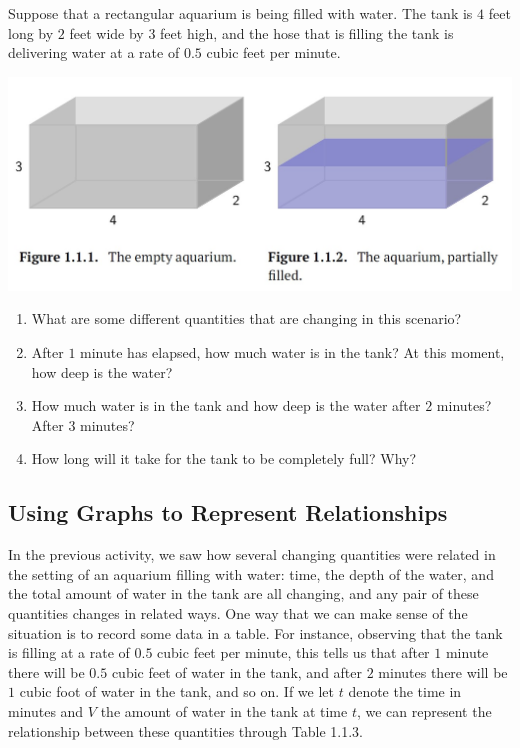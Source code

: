 \documentclass{ximera}
\begin{document}
\begin{tcolorbox}[colback=yellow!15, breakable,pad at break*=1mm]
\begin{example}
Suppose that a rectangular aquarium is being filled with water.  The tank is \(4\) feet long by \(2\) feet wide by \(3\) feet high, and the hose that is filling the tank is delivering water at a rate of \(0.5\) cubic feet per minute.

\includegraphics[width=\textwidth]{APCfigure1-1-1.jpg}

\begin{enumerate}[label=\alph*.]
\item What are some different quantities that are changing in this scenario?%
\item After \(1\) minute has elapsed, how much water is in the tank?  At this moment, how deep is the water?%
\item How much water is in the tank and how deep is the water after \(2\) minutes?  After \(3\) minutes?%
\item How long will it take for the tank to be completely full?  Why?%
\end{enumerate}
\end{example}
\end{tcolorbox}




\subsection{Using Graphs to Represent Relationships}
In the previous activity, we saw how several changing quantities were related in the setting of an aquarium filling with water: time, the depth of the water, and the total amount of water in the tank are all changing, and any pair of these quantities changes in related ways.  One way that we can make sense of the situation is to record some data in a table.  For instance, observing that the tank is filling at a rate of \(0.5\) cubic feet per minute, this tells us that after \(1\) minute there will be \(0.5\) cubic feet of water in the tank, and after \(2\) minutes there will be \(1\) cubic foot of water in the tank, and so on.  If we let \(t\) denote the time in minutes and \(V\) the amount of water in the tank at time \(t\), we can represent the relationship between these quantities through Table 1.1.3.%
\end{document}
